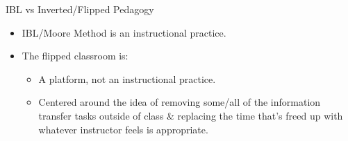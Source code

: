 \documentclass[10pt]{beamer}
\begin{document}

\begin{frame}

\begin{block}{IBL vs Inverted/Flipped Pedagogy}
\begin{itemize}
\item <2->IBL/Moore Method is an instructional practice.
\item<3-> The flipped classroom is:
    \begin{itemize}\normalsize
    \item<4-> A platform, not an instructional practice. 
    \item<5-> Centered around the idea of removing some/all of the information transfer tasks outside of class \& replacing the time that's freed up with whatever instructor feels is appropriate.
    \end{itemize}
\end{itemize}
\end{block}

\end{frame}

\end{document}
